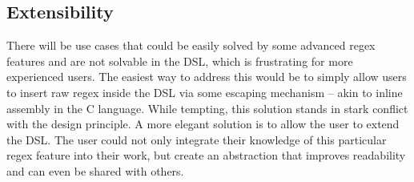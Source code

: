 \subsection{Extensibility} \label{sec:extensibility}

There will be use cases that could be easily solved by some advanced regex features and are not solvable in the DSL, which is frustrating for more experienced users. The easiest way to address this would be to simply allow users to insert raw regex inside the DSL via some escaping mechanism -- akin to inline assembly in the C language. While tempting, this solution stands in stark conflict with the design principle. A more elegant solution is to allow the user to extend the DSL. The user could not only integrate their knowledge of this particular regex feature into their work, but create an abstraction that improves readability and can even be shared with others.

